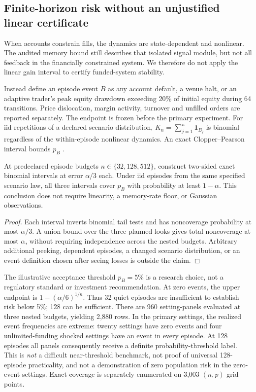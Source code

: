 \subsection{Finite-horizon risk without an unjustified linear certificate}
When accounts constrain fills, the dynamics are state-dependent and nonlinear. The audited memory bound still describes that isolated signal module, but not all feedback in the financially constrained system. We therefore do not apply the linear gain interval to certify funded-system stability.

Instead define an episode event $B$ as any account default, a venue halt, or an adaptive trader's peak equity drawdown exceeding 20\% of initial equity during 64 transitions. Price dislocation, margin activity, turnover and unfilled orders are reported separately. The endpoint is frozen before the primary experiment. For iid repetitions of a declared scenario distribution, $K_n=\sum_{j=1}^n\mathbf{1}_{B_j}$ is binomial regardless of the within-episode nonlinear dynamics. An exact Clopper--Pearson interval bounds $p_B$ \citep{clopper1934}.

\begin{proposition}
At predeclared episode budgets $n\in\{32,128,512\}$, construct two-sided exact binomial intervals at error $\alpha/3$ each. Under iid episodes from the same specified scenario law, all three intervals cover $p_B$ with probability at least $1-\alpha$. This conclusion does not require linearity, a memory-rate floor, or Gaussian observations.
\end{proposition}
\begin{proof}
Each interval inverts binomial tail tests and has noncoverage probability at most $\alpha/3$. A union bound over the three planned looks gives total noncoverage at most $\alpha$, without requiring independence across the nested budgets. Arbitrary additional peeking, dependent episodes, a changed scenario distribution, or an event definition chosen after seeing losses is outside the claim.
\end{proof}

The illustrative acceptance threshold $p_B=5\%$ is a research choice, not a regulatory standard or investment recommendation. At zero events, the upper endpoint is $1-(\alpha/6)^{1/n}$. Thus 32 quiet episodes are insufficient to establish risk below 5\%; 128 can be sufficient. There are 960 setting-panels evaluated at three nested budgets, yielding 2,880 rows. In the primary settings, the realized event frequencies are extreme: twenty settings have zero events and four unlimited-funding shocked settings have an event in every episode. At 128 episodes all panels consequently receive a definite probability-threshold label. This is \emph{not} a difficult near-threshold benchmark, not proof of universal 128-episode practicality, and not a demonstration of zero population risk in the zero-event settings. Exact coverage is separately enumerated on 3,003 $(n,p)$ grid points.

